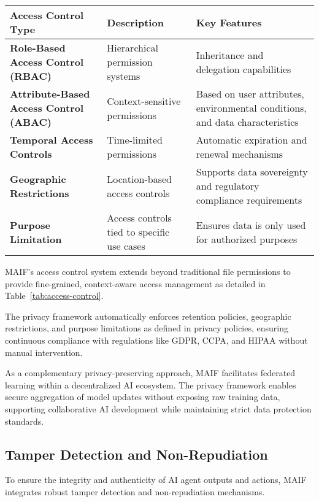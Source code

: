 \documentclass[conference]{IEEEtran}
\begin{document}
\begin{table*}[!t]
\renewcommand{\arraystretch}{1.3}
\caption{MAIF Granular Access Control Mechanisms}
\label{tab:access-control}
\centering
\footnotesize
\begin{tabular}{p{3.5cm}p{6cm}p{4.5cm}}
\toprule
\textbf{Access Control Type} & \textbf{Description} & \textbf{Key Features} \\
\midrule
\textbf{Role-Based Access Control (RBAC)} & Hierarchical permission systems & Inheritance and delegation capabilities \\
\textbf{Attribute-Based Access Control (ABAC)} & Context-sensitive permissions & Based on user attributes, environmental conditions, and data characteristics \\
\textbf{Temporal Access Controls} & Time-limited permissions & Automatic expiration and renewal mechanisms \\
\textbf{Geographic Restrictions} & Location-based access controls & Supports data sovereignty and regulatory compliance requirements \\
\textbf{Purpose Limitation} & Access controls tied to specific use cases & Ensures data is only used for authorized purposes \\
\bottomrule
\end{tabular}
\end{table*}

MAIF's access control system extends beyond traditional file permissions to provide fine-grained, context-aware access management as detailed in Table~\ref{tab:access-control}.

The privacy framework automatically enforces retention policies, geographic restrictions, and purpose limitations as defined in privacy policies, ensuring continuous compliance with regulations like GDPR, CCPA, and HIPAA without manual intervention.

As a complementary privacy-preserving approach, MAIF facilitates federated learning within a decentralized AI ecosystem\cite{ref85}. The privacy framework enables secure aggregation of model updates without exposing raw training data, supporting collaborative AI development while maintaining strict data protection standards.

\subsection{Tamper Detection and Non-Repudiation}

To ensure the integrity and authenticity of AI agent outputs and actions, MAIF integrates robust tamper detection and non-repudiation mechanisms.
\end{document}
